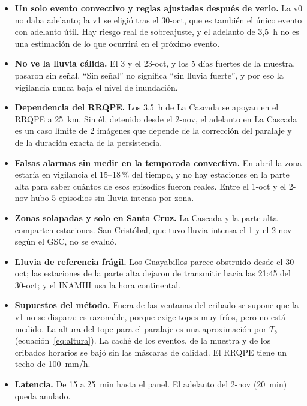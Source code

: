 \documentclass{sosg-informe}
\begin{document}
\begin{itemize}
  \item \textbf{Un solo evento convectivo y reglas ajustadas después de verlo.} La v0 no daba adelanto; la v1 se eligió tras el 30-oct, que es también el único evento con adelanto útil. Hay riesgo real de sobreajuste, y el adelanto de 3,5~h no es una estimación de lo que ocurrirá en el próximo evento.
  \item \textbf{No ve la lluvia cálida.} El 3 y el 23-oct, y los 5 días fuertes de la muestra, pasaron sin señal. \enquote{Sin señal} no significa \enquote{sin lluvia fuerte}, y por eso la vigilancia nunca baja el nivel de inundación.
  \item \textbf{Dependencia del RRQPE.} Los 3,5~h de La Cascada se apoyan en el RRQPE a 25~km. Sin él, detenido desde el 2-nov, el adelanto en La Cascada es un caso límite de 2 imágenes que depende de la corrección del paralaje y de la duración exacta de la persistencia.
  \item \textbf{Falsas alarmas sin medir en la temporada convectiva.} En abril la zona estaría en vigilancia el 15--18\,\% del tiempo, y no hay estaciones en la parte alta para saber cuántos de esos episodios fueron reales. Entre el 1-oct y el 2-nov hubo 5 episodios sin lluvia intensa por zona.
  \item \textbf{Zonas solapadas y solo en Santa Cruz.} La Cascada y la parte alta comparten estaciones. San Cristóbal, que tuvo lluvia intensa el 1 y el 2-nov según el GSC, no se evaluó.
  \item \textbf{Lluvia de referencia frágil.} Los Guayabillos parece obstruido desde el 30-oct; las estaciones de la parte alta dejaron de transmitir hacia las 21:45 del 30-oct; y el INAMHI usa la hora continental.
  \item \textbf{Supuestos del método.} Fuera de las ventanas del cribado se supone que la v1 no se dispara: es razonable, porque exige topes muy fríos, pero no está medido. La altura del tope para el paralaje es una aproximación por $T_b$ (ecuación~\ref{eq:altura}). La caché de los eventos, de la muestra y de los cribados horarios se bajó sin las máscaras de calidad. El RRQPE tiene un techo de 100~mm/h.
  \item \textbf{Latencia.} De 15 a 25~min hasta el panel. El adelanto del 2-nov (20~min) queda anulado.
\end{itemize}
\end{document}
